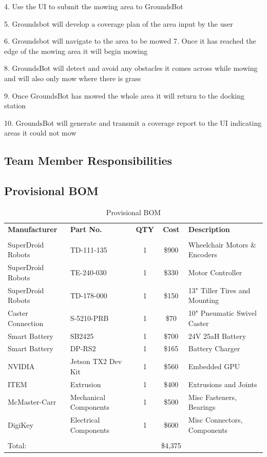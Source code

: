 \documentclass[12pt]{extarticle}
\begin{document}
4. Use the UI to submit the mowing area to GroundsBot

5. Groundsbot will develop a coverage plan of the area input by the user


6. Groundsbot will navigate to the area to be mowed
7. Once it has reached the edge of the mowing area it will begin mowing

8. GroundsBot will detect and avoid any obstacles it comes across while mowing and will also only mow where there is grass

9. Once GroundsBot has mowed the whole area it will return to the docking station

10. GroundsBot will generate and transmit a coverage report to the UI indicating areas it could not mow

\subsection{Team Member Responsibilities}
\subsection{Provisional BOM}
\begin{table}[H]
\centering
\def\arraystretch{1.1}
\caption*{\sffamily\fontsize{12}{14}\selectfont 
Provisional BOM}\label{Tab:provisional_bom}
\begin{tabular}{ llccl }
\hline
    \textbf{Manufacturer} & \textbf{Part No.} & \textbf{QTY} & \textbf{Cost} & \textbf{Description}\\
    \\[-.8ex]
    SuperDroid Robots & TD-111-135 & 1 & \$900 & Wheelchair Motors \& Encoders \\
	SuperDroid Robots & TE-240-030 & 1 & \$330 & Motor Controller \\
	SuperDroid Robots & TD-178-000 & 1 & \$150 & 13" Tiller Tires and Mounting \\
	Caster Connection & S-5210-PRB & 1 & \$70 & 10" Pneumatic Swivel Caster \\
	Smart Battery & SB2425 & 1 & \$700 & 24V 25aH Battery \\
    Smart Battery & DP-RS2 & 1 & \$165 & Battery Charger \\
    NVIDIA & Jetson TX2 Dev Kit & 1 & \$560 &  Embedded GPU \\
	ITEM & Extrusion & 1 & \$400 & Extrusions and Joints \\
	McMaster-Carr & Mechanical Components & 1 & \$500 & Misc Fasteners, Bearings \\
	DigiKey & Electrical Components & 1 & \$600 & Misc Connectors, Components \\[.5ex]
	\hline 
	\\[-2ex]
	Total: &&& \$4,375 &\\
	
    
\end{tabular}
\end{table}
\end{document}

